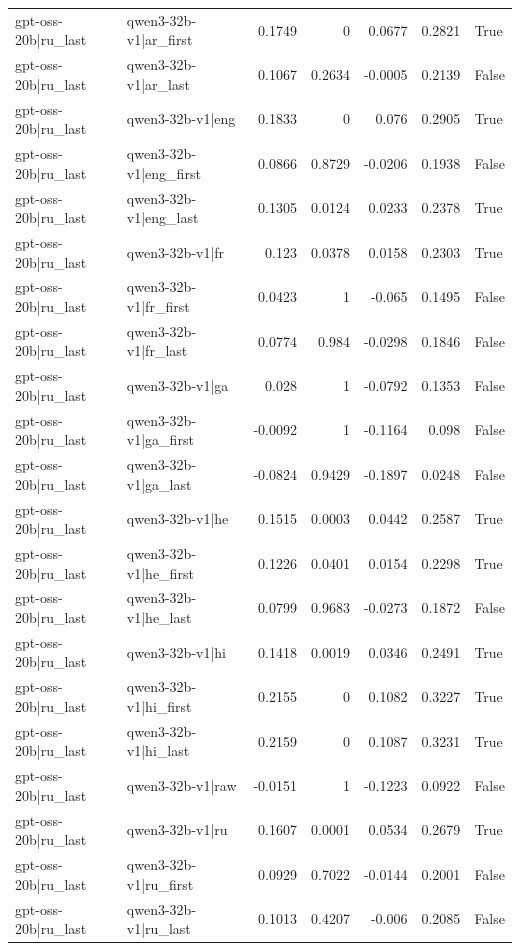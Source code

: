\begin{table}
\begin{tabular}{l l r r r r l}
gpt-oss-20b|ru_last & qwen3-32b-v1|ar_first & 0.1749 & 0 & 0.0677 & 0.2821 & True \\
gpt-oss-20b|ru_last & qwen3-32b-v1|ar_last & 0.1067 & 0.2634 & -0.0005 & 0.2139 & False \\
gpt-oss-20b|ru_last & qwen3-32b-v1|eng & 0.1833 & 0 & 0.076 & 0.2905 & True \\
gpt-oss-20b|ru_last & qwen3-32b-v1|eng_first & 0.0866 & 0.8729 & -0.0206 & 0.1938 & False \\
gpt-oss-20b|ru_last & qwen3-32b-v1|eng_last & 0.1305 & 0.0124 & 0.0233 & 0.2378 & True \\
gpt-oss-20b|ru_last & qwen3-32b-v1|fr & 0.123 & 0.0378 & 0.0158 & 0.2303 & True \\
gpt-oss-20b|ru_last & qwen3-32b-v1|fr_first & 0.0423 & 1 & -0.065 & 0.1495 & False \\
gpt-oss-20b|ru_last & qwen3-32b-v1|fr_last & 0.0774 & 0.984 & -0.0298 & 0.1846 & False \\
gpt-oss-20b|ru_last & qwen3-32b-v1|ga & 0.028 & 1 & -0.0792 & 0.1353 & False \\
gpt-oss-20b|ru_last & qwen3-32b-v1|ga_first & -0.0092 & 1 & -0.1164 & 0.098 & False \\
gpt-oss-20b|ru_last & qwen3-32b-v1|ga_last & -0.0824 & 0.9429 & -0.1897 & 0.0248 & False \\
gpt-oss-20b|ru_last & qwen3-32b-v1|he & 0.1515 & 0.0003 & 0.0442 & 0.2587 & True \\
gpt-oss-20b|ru_last & qwen3-32b-v1|he_first & 0.1226 & 0.0401 & 0.0154 & 0.2298 & True \\
gpt-oss-20b|ru_last & qwen3-32b-v1|he_last & 0.0799 & 0.9683 & -0.0273 & 0.1872 & False \\
gpt-oss-20b|ru_last & qwen3-32b-v1|hi & 0.1418 & 0.0019 & 0.0346 & 0.2491 & True \\
gpt-oss-20b|ru_last & qwen3-32b-v1|hi_first & 0.2155 & 0 & 0.1082 & 0.3227 & True \\
gpt-oss-20b|ru_last & qwen3-32b-v1|hi_last & 0.2159 & 0 & 0.1087 & 0.3231 & True \\
gpt-oss-20b|ru_last & qwen3-32b-v1|raw & -0.0151 & 1 & -0.1223 & 0.0922 & False \\
gpt-oss-20b|ru_last & qwen3-32b-v1|ru & 0.1607 & 0.0001 & 0.0534 & 0.2679 & True \\
gpt-oss-20b|ru_last & qwen3-32b-v1|ru_first & 0.0929 & 0.7022 & -0.0144 & 0.2001 & False \\
gpt-oss-20b|ru_last & qwen3-32b-v1|ru_last & 0.1013 & 0.4207 & -0.006 & 0.2085 & False \\

\end{tabular}
\end{table}
